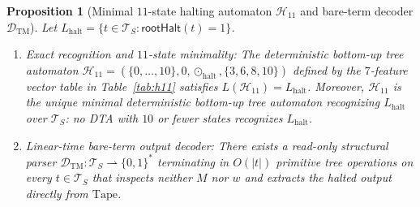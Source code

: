 \documentclass[11pt,reqno]{amsart}
\numberwithin{equation}{section}
\theoremstyle{plain}
\newtheorem{proposition}[theorem]{Proposition}
\theoremstyle{definition}
\theoremstyle{remark}
\newcommand{\TS}{\mathcal{T}_S}
\begin{document}
\begin{proposition}[Minimal $11$-state halting automaton $\mathcal{H}_{11}$ and bare-term decoder $\mathcal{D}_{\mathrm{TM}}$]\label{prop:halt-automaton}
Let $L_{\mathrm{halt}} = \{t \in \TS : \mathsf{rootHalt}(t) = 1\}$.
\begin{enumerate}[label=(\roman*),leftmargin=2.2em]
  \item \emph{Exact recognition and $11$-state minimality:} The deterministic bottom-up tree automaton $\mathcal{H}_{11} = (\{0,\dots,10\}, 0, \odot_{\mathrm{halt}}, \{3, 6, 8, 10\})$ defined by the $7$-feature vector table in Table~\ref{tab:h11} satisfies $L(\mathcal{H}_{11}) = L_{\mathrm{halt}}$. Moreover, $\mathcal{H}_{11}$ is the unique minimal deterministic bottom-up tree automaton recognizing $L_{\mathrm{halt}}$ over $\TS$: no DTA with $10$ or fewer states recognizes $L_{\mathrm{halt}}$.
  \item \emph{Linear-time bare-term output decoder:} There exists a read-only structural parser $\mathcal{D}_{\mathrm{TM}} \colon \TS \rightharpoonup \{0,1\}^*$ terminating in $O(|t|)$ primitive tree operations on every $t \in \TS$ that inspects neither $M$ nor $w$ and extracts the halted output directly from $\mathrm{Tape}$.
\end{enumerate}
\end{proposition}
\end{document}
